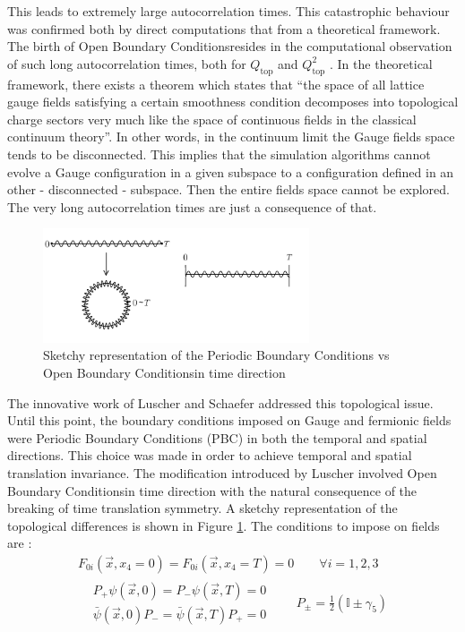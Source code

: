 \documentclass[english, LaM, oneside, noexaminfo]{sapthesis}
\newcommand{\obc}{Open Boundary Conditions}
\begin{document}
This leads to extremely large autocorrelation times.
\newline
This catastrophic behaviour was confirmed both by direct computations that from a theoretical framework.
The birth of \obc\space resides in the computational observation of such long autocorrelation times, both for $Q_\text{top}$ \cite{investigatin-critical-slowing-down} and $Q_\text{top}^2$ \cite{critical-slowing-down-error-analysis}. 
In the theoretical framework, there exists a theorem \cite{Topology-WilsonFlow-HMC} which states that ``the space of all lattice gauge fields satisfying a certain smoothness condition decomposes into topological charge sectors very much like the space of continuous fields in the classical continuum theory''.
In other words, in the continuum limit the Gauge fields space tends to be disconnected.
This implies that the simulation algorithms cannot evolve a Gauge configuration in a given subspace to a configuration defined in an other - disconnected - subspace.
Then the entire fields space cannot be explored. 
The very long autocorrelation times are just a consequence of that.
\begin{figure}[h!]
    \centering
    \includegraphics[width=0.7\textwidth]{imgs-MSc-thesis/torus-obc.png}
    \caption{Sketchy representation of the Periodic Boundary Conditions vs \obc\space in time direction}
    \label{fig:torus}
\end{figure}
\newline
The innovative work of Luscher and Schaefer addressed this topological issue.
Until this point, the boundary conditions imposed on Gauge and fermionic fields were Periodic Boundary Conditions (PBC) in both the temporal and spatial directions.
This choice was made in order to achieve temporal and spatial translation invariance.
The modification introduced by Luscher involved \obc\space in time direction with the natural consequence of the breaking of time translation symmetry.
A sketchy representation of the topological differences is shown in Figure \ref{fig:torus}.
The conditions to impose on fields are \cite{OBC_top}:
\begin{equation*}
    \begin{gathered}
        F_{0i}(\vec x, x_4=0) = F_{0i}(\vec x, x_4=T) = 0 \qquad \forall i = 1,2,3 \\
        \begin{aligned}
            & P_+ \psi (\vec x, 0) = P_- \psi (\vec x, T) = 0 \\
            & \bar\psi (\vec x, 0) P_- = \bar\psi (\vec x, T) P_+ = 0 
        \end{aligned}
        \quad\quad P_{\pm} = \frac{1}{2}\left(\mathbb{I} \pm \gamma_5 \right)
    \end{gathered}
\end{equation*}
\end{document}
